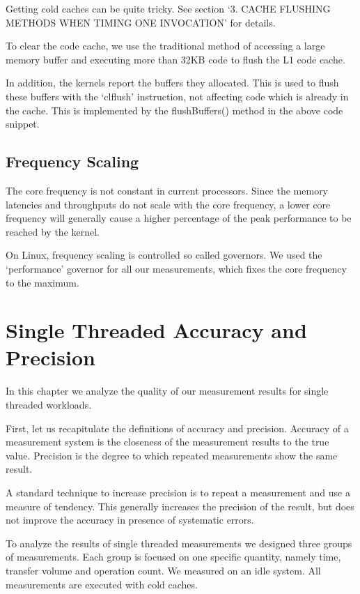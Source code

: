 \documentclass[a4paper,12pt]{report}
\newcommand{\method}[1]{\textsf{#1}}
\begin{document}
Getting cold caches can be quite tricky. See
\cite{Whaley:2008:AAC:1462062.1462065} section `3.
CACHE FLUSHING METHODS WHEN TIMING ONE INVOCATION' for details.

To clear the code cache, we use the traditional method of accessing a large
memory buffer and executing more than 32KB code to flush the L1 code cache.

In addition, the kernels report the buffers they allocated. This is used to
flush these buffers with the `clflush' instruction, not affecting code which is
already in the cache. This is implemented by the \method{flushBuffers()}
method in the above code snippet.

\section{Frequency Scaling}
The core frequency is not constant in current processors. Since the memory
latencies and throughputs do not scale with the core frequency, a lower core
frequency will generally cause a higher percentage of the peak performance to be
reached by the kernel.

On Linux, frequency scaling is controlled so called governors. We used the
`performance' governor for all our measurements, which fixes the core frequency
to the maximum.

\chapter{Single Threaded Accuracy and Precision}
In this chapter we analyze the quality of our measurement results for single
threaded workloads.

First, let us recapitulate the definitions of accuracy and precision.
\cite{accuracyAndPrecision} Accuracy of a measurement system is the closeness of
the measurement results to the true value.
Precision is the degree to which repeated measurements show the same result.

A standard technique to increase precision is to repeat a measurement and use
a measure of tendency. This generally increases the precision of the result, but
does not improve the accuracy in presence of systematic errors.

To analyze the results of single threaded measurements we designed three groups
of measurements. Each group is focused on one specific quantity, namely time,
transfer volume and operation count. We measured on an idle system. All
measurements are executed with cold caches.
\end{document}
